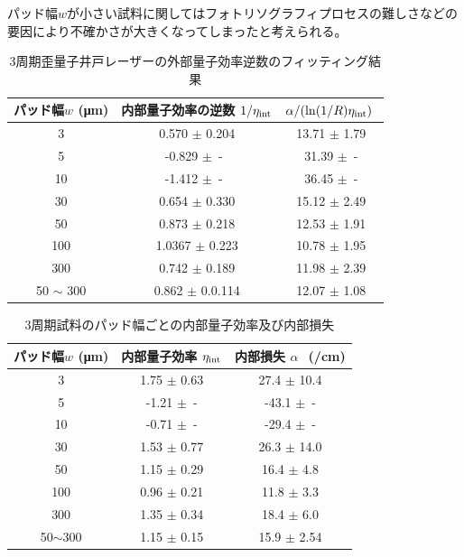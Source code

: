 {パッド幅$w$が小さい試料に関してはフォトリソグラフィプロセスの難しさなどの要因により不確かさが大きくなってしまったと考えられる。

\begin{table}[h]
  \caption{3周期歪量子井戸レーザーの外部量子効率逆数のフィッティング結果}
  \label{table:table_3QW_i_d_fit}
  \centering
  \begin{tabular}{ccc}
    \hline
    パッド幅$w$ (\si{\micro\metre})  &  内部量子効率の逆数 $1/\eta_{\rm{int}} $ & $\alpha/(\ln(1/R)\eta_{\rm{int}})\ $ \\
    \hline \hline
     3 & 0.570 $\pm$ 0.204  & 13.71 $\pm$ 1.79 \\
    5  & -0.829 $\pm$\ -\ & 31.39 $\pm$\ -\\
    10  & -1.412 $\pm$\ -\  & 36.45 $\pm$\ -\\ 
    30& 0.654 $\pm$ 0.330& 15.12 $\pm$ 2.49\\
    50& 0.873 $\pm$ 0.218&12.53 $\pm$ 1.91 \\
    100& 1.0367 $\pm$ 0.223& 10.78 $\pm$ 1.95\\
    300&0.742 $\pm$ 0.189 & 11.98 $\pm$ 2.39\\
    \hline
    50 $\sim$ 300 & 0.862 $\pm$ 0.0.114 & 12.07 $\pm$ 1.08\\
    \hline

  \end{tabular}
\end{table}


\begin{table}[h]
  \caption{3周期試料のパッド幅ごとの内部量子効率及び内部損失}
  \label{table:table_3QW_i_int}
  \centering
  \begin{tabular}{ccc}
    \hline
    パッド幅$w$ (\si{\micro\metre})  &  内部量子効率 $\eta_{\rm{int}} $ &内部損失 $\alpha\ $\ (/\si{cm}) \\
    \hline \hline
     3 & 1.75 $\pm$ 0.63 & 27.4 $\pm$ 10.4  \\
    5  & -1.21 $\pm$\ - & -43.1 $\pm$\ -\\
    10  & -0.71 $\pm$\ - & -29.4 $\pm$\ -\\ 
    30& 1.53 $\pm$ 0.77& 26.3 $\pm$ 14.0\\
    50& 1.15 $\pm$ 0.29&16.4 $\pm$ 4.8 \\
    100& 0.96 $\pm$ 0.21& 11.8 $\pm$ 3.3\\
    300&1.35 $\pm$ 0.34 & 18.4 $\pm$ 6.0\\
    \hline
    50$\sim$300& 1.15 $\pm$ 0.15 & 15.9 $\pm$ 2.54\\
    \hline
  \end{tabular}
\end{table}


}
